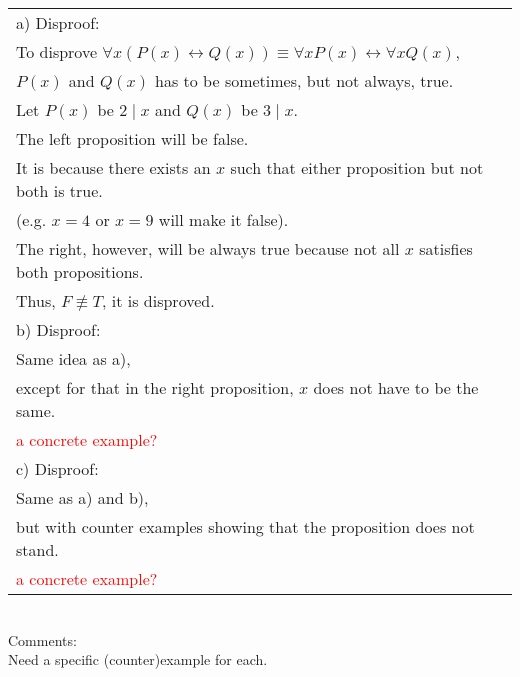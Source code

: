 \documentclass[12pt]{exam}
\begin{document}
\begin{solution}
	\begin{tabular}{ll}
		a) Disproof:                                                                                             \\
		To disprove $\forall x(P(x) \leftrightarrow Q(x)) \equiv \forall x P(x) \leftrightarrow \forall x Q(x)$, \\
		$P(x)$ and $Q(x)$ has to be sometimes, but not always, true.                                             \\
		Let $P(x)$ be $2 \mid x$ and $Q(x)$ be $3 \mid x$.                                                       \\
		The left proposition will be false.                                                                      \\
		It is because there exists an $x$ such that either proposition but not both is true.                     \\
		(e.g. $x=4$ or $x=9$ will make it false).                                                                \\
		The right, however, will be always true because not all $x$ satisfies both propositions.                 \\
		Thus, $F \not \equiv T$, it is disproved.                                                                \\
		b) Disproof:                                                                                             \\
		Same idea as a),                                                                                         \\
		except for that in the right proposition, $x$ does not have to be the same.                              \\
		\textcolor{red}{a concrete example?}                                                                     \\
		c) Disproof:                                                                                             \\
		Same as a) and b),                                                                                       \\
		but with counter examples showing that the proposition does not stand.                                   \\
		\textcolor{red}{a concrete example?}                                                                     \\
	\end{tabular}
	\\Comments:\\
	Need a specific (counter)example for each.
\end{solution}
\end{document}
